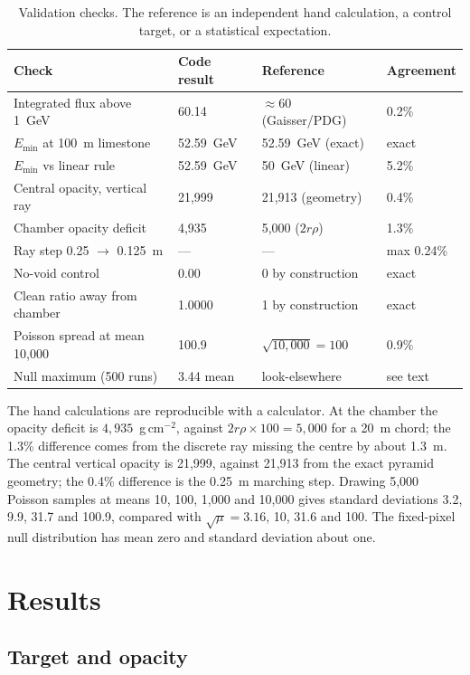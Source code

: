 \documentclass{article}
\begin{document}
\begin{table}[t]
\centering
\caption{Validation checks. The reference is an independent hand calculation,
a control target, or a statistical expectation.}
\label{tab:validation}
\small
\begin{tabular}{@{}p{4.2cm}p{2.8cm}p{3.2cm}p{2.3cm}@{}}
\toprule
Check & Code result & Reference & Agreement \\
\midrule
Integrated flux above 1~GeV & 60.14 & $\approx60$ (Gaisser/PDG) & 0.2\% \\
$E_{\min}$ at 100~m limestone & 52.59~GeV & 52.59~GeV (exact) & exact \\
$E_{\min}$ vs linear rule & 52.59~GeV & 50~GeV (linear) & 5.2\% \\
Central opacity, vertical ray & 21{,}999 & 21{,}913 (geometry) & 0.4\% \\
Chamber opacity deficit & 4{,}935 & 5{,}000 ($2r\rho$) & 1.3\% \\
Ray step 0.25 $\to$ 0.125~m & --- & --- & max 0.24\% \\
No-void control & 0.00 & 0 by construction & exact \\
Clean ratio away from chamber & 1.0000 & 1 by construction & exact \\
Poisson spread at mean 10{,}000 & 100.9 & $\sqrt{10{,}000}=100$ & 0.9\% \\
Null maximum (500 runs) & 3.44 mean & look-elsewhere & see text \\
\bottomrule
\end{tabular}
\end{table}

The hand calculations are reproducible with a calculator. At the chamber the
opacity deficit is $4{,}935$~g\,cm$^{-2}$, against
$2r\rho\times100=5{,}000$ for a 20~m chord; the 1.3\% difference comes from the
discrete ray missing the centre by about 1.3~m. The central vertical opacity is
21,999, against 21,913 from the exact pyramid geometry; the 0.4\% difference is
the 0.25~m marching step. Drawing 5,000 Poisson samples at means 10, 100, 1,000
and 10,000 gives standard deviations 3.2, 9.9, 31.7 and 100.9, compared with
$\sqrt{\mu}=3.16$, 10, 31.6 and 100. The fixed-pixel null distribution has mean
zero and standard deviation about one.


\section{Results}
\label{sec:results}

\subsection{Target and opacity}
\end{document}
